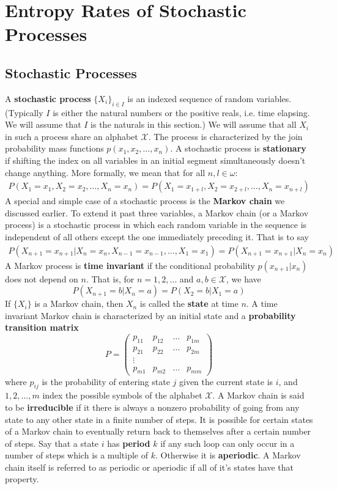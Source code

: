 \section{Entropy Rates of Stochastic Processes}
\subsection{Stochastic Processes}
A \textbf{stochastic process} $\{X_i\}_{i \in I}$ is an indexed sequence of random variables. (Typically $I$ is either the natural numbers or the positive reals, i.e. time elapsing. We will assume that $I$ is the naturals in this section.) We will assume that all $X_i$ in such a process share an alphabet $\mathcal{X}$. The process is characterized by the join probability mass functions $p(x_1,x_2,\ldots,x_n)$. A stochastic process is \textbf{stationary} if shifting the index on all variables in an initial segment simultaneously doesn't change anything. More formally, we mean that for all $n,l \in \omega$:
\begin{align}
	P(X_1 = x_1,X_2 = x_2,\ldots,X_n = x_n) = P(X_1 = x_{1+l},X_2 = x_{2+l},\ldots,X_n = x_{n+l})
\end{align} 
A special and simple case of a stochastic process is the \textbf{Markov chain} we discussed earlier. To extend it past three variables, a Markov chain (or a Markov process) is a stochastic process in which each random variable in the sequence is independent of all others except the one immediately preceding it. That is to say
\begin{align}
	P(X_{n+1} = x_{n+1}|X_n = x_n,X_{n-1}=x_{n-1},\ldots,X_1 = x_1) = P(X_{n+1}=x_{n+1}|X_n = x_n)
\end{align}
A Markov process is \textbf{time invariant} if the conditional probability $p(x_{n+1}|x_n)$ does not depend on $n$. That is, for $n=1,2,\ldots$ and $a,b\in \mathcal{X}$, we have
\[ P(X_{n+1}=b|X_n=a) = P(X_2=b|X_1=a) \]
If $\{X_i\}$ is a Markov chain, then $X_n$ is called the \textbf{state} at time $n$. A time invariant Markov chain is characterized by an initial state and a \textbf{probability transition matrix}
\[ P = \begin{pmatrix} p_{11} & p_{12} & \ldots & p_{1m} \\
						p_{21} & p_{22} & \ldots & p_{2m} \\
						\vdots \\
						p_{m1} & p_{m2} & \ldots & p_{mm} \end{pmatrix} \]
where $p_{ij}$ is the probability of entering state $j$ given the current state is $i$, and $1,2,\ldots,m$ index the possible symbols of the alphabet $\mathcal{X}$. A Markov chain is said to be \textbf{irreducible} if it there is always a nonzero probability of going from any state to any other state in a finite number of steps. It is possible for certain states of a Markov chain to eventually return back to themselves after a certain number of steps. Say that a state $i$ has \textbf{period} $k$ if any such loop can only occur in a number of steps which is a multiple of $k$. Otherwise it is \textbf{aperiodic}. A Markov chain itself is referred to as periodic or aperiodic if all of it's states have that property. \par 
